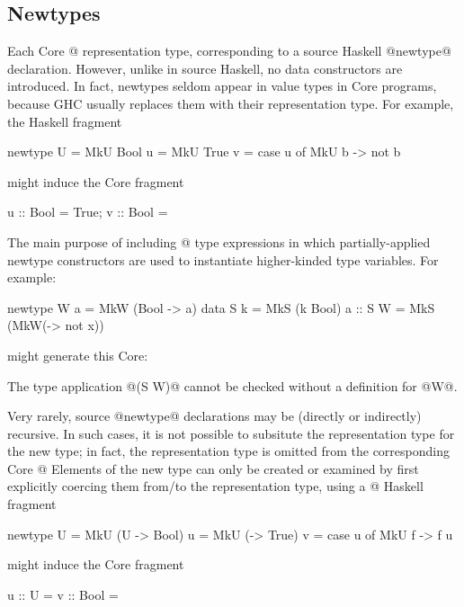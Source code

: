\documentclass[10pt]{article}
\begin{document}
\subsection{Newtypes}
\label{sec:newtypes}


Each Core @%
representation type, corresponding to a source Haskell @newtype@
declaration.  However, unlike in source Haskell, no data constructors are introduced.
In fact, newtypes seldom appear in value types
in Core programs, because GHC usually replaces them with their representation type.
For example, the Haskell fragment
\begin{code}
newtype U = MkU Bool
u = MkU True
v = case u of
  MkU b -> not b
\end{code}
might induce the Core fragment
\begin{code}
u :: Bool = True;
v :: Bool = 
\end{code}
The main purpose of including @%
type expressions in which partially-applied newtype constructors are used to instantiate higher-kinded
type variables.  For example:
\begin{code}
newtype W a = MkW (Bool -> a)
data S k = MkS (k Bool)
a :: S W = MkS (MkW(\x -> not x))
\end{code}
might generate this Core:
The type application @(S W)@ cannot be checked without a definition for @W@.

Very rarely, source @newtype@ declarations may be (directly or indirectly) recursive. In such
cases, it is not possible to subsitute the representation type for the new type;
in fact, the representation type is omitted from the corresponding Core @%
Elements of the new
type can only be created or examined by first explicitly coercing them from/to
the representation type, using a @%
Haskell fragment
\begin{code}
newtype U = MkU (U -> Bool)
u = MkU (\x -> True)
v = case u of
  MkU f -> f u
\end{code}
might induce the Core fragment
\begin{code}
u :: U = %
v :: Bool = 
\end{code}
\end{document}

